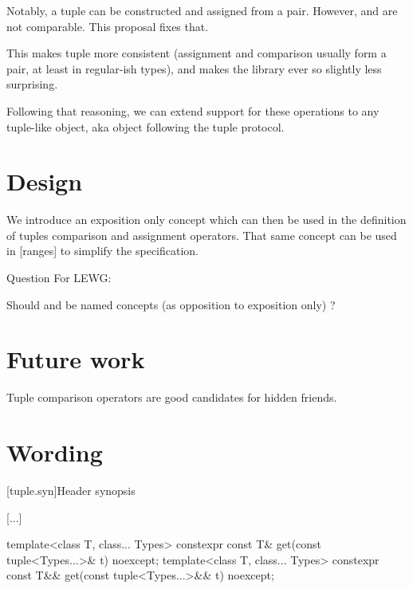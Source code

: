 \documentclass{wg21}
\begin{document}
Notably, a tuple can be constructed and assigned from a pair.
However,  and  are not comparable.
This proposal fixes that.

This makes tuple more consistent (assignment and comparison usually form a pair, at least in regular-ish types),
and makes the library ever so slightly less surprising.

Following that reasoning, we can extend support for these operations to any tuple-like object, aka object following
the tuple protocol.
 
\section{Design}

We introduce an exposition only concept  which can then be used in the definition of tuples
comparison and assignment operators.
That same concept can be used in [ranges] to simplify the specification.

Question For LEWG:

Should  and  be named concepts (as opposition to exposition only) ?


\section{Future work}

Tuple comparison operators are good candidates for hidden friends. 

\section{Wording}


[tuple.syn]{Header  synopsis}

[...]
\begin{codeblock}
    
template<class T, class... Types>
constexpr const T& get(const tuple<Types...>& t) noexcept;
template<class T, class... Types>
constexpr const T&& get(const tuple<Types...>&& t) noexcept;   
\end{codeblock}
\end{document}
